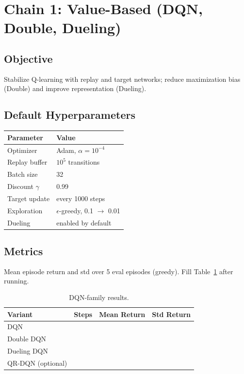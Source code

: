 \documentclass[11pt]{article}
\begin{document}
\section{Chain 1: Value-Based (DQN, Double, Dueling)}
\subsection{Objective}
Stabilize Q-learning with replay and target networks; reduce maximization bias (Double) and improve representation (Dueling).

\subsection{Default Hyperparameters}
\begin{table}[h]
\centering
\begin{tabular}{ll}
\toprule
Parameter & Value \\
\midrule
Optimizer & Adam, $\alpha=10^{-4}$ \\
Replay buffer & $10^5$ transitions \\
Batch size & 32 \\
Discount $\gamma$ & 0.99 \\
Target update & every 1000 steps \\
Exploration & $\epsilon$-greedy, 0.1 $\to$ 0.01 \\
Dueling & enabled by default \\
\bottomrule
\end{tabular}
\end{table}

\subsection{Metrics}
Mean episode return and std over 5 eval episodes (greedy). Fill Table~\ref{tab:dqnresults} after running.

\begin{table}[h]
\centering
\caption{DQN-family results.}
\label{tab:dqnresults}
\begin{tabular}{lccc}
\toprule
Variant & Steps & Mean Return & Std Return \\
\midrule
DQN & & & \\
Double DQN & & & \\
Dueling DQN & & & \\
QR-DQN (optional) & & & \\
\bottomrule
\end{tabular}
\end{table}
\end{document}
